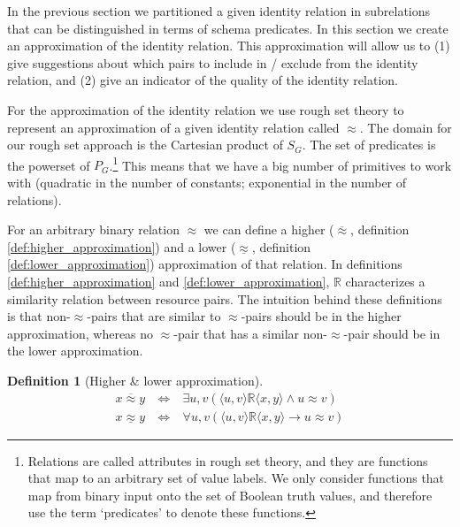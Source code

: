 \documentclass[letterpaper]{article}
\newtheorem{definition}{Definition}
\begin{document}
In the previous section we partitioned a given identity relation in subrelations that can be distinguished in terms of schema predicates. In this section we create an approximation of the identity relation. This approximation will allow us to (1) give suggestions about which pairs to include in / exclude from the identity relation, and (2) give an indicator of the quality of the identity relation.

For the approximation of the identity relation we use rough set theory \cite{pawlak_1991} to represent an approximation of a given identity relation called $\approx$. The domain for our rough set approach is the Cartesian product of $S_G$. The set of predicates is the powerset of $P_G$.\footnote{Relations are called attributes in rough set theory, and they are functions that map to an arbitrary set of value labels. We only consider functions that map from binary input onto the set of Boolean truth values, and therefore use the term `predicates' to denote these functions.} This means that we have a big number of primitives to work with (quadratic in the number of constants; exponential in the number of relations).

For an arbitrary binary relation $\approx$ we can define a higher ($\overline{\approx}$, definition \ref{def:higher_approximation}) and a lower ($\underline{\approx}$, definition \ref{def:lower_approximation}) approximation of that relation. In definitions \ref{def:higher_approximation} and \ref{def:lower_approximation}, $\mathbb{R}$ characterizes a similarity relation between resource pairs. The intuition behind these definitions is that non-$\approx$-pairs that are similar to $\approx$-pairs should be in the higher approximation, whereas no $\approx$-pair that has a similar non-$\approx$-pair should be in the lower approximation.

\begin{definition}[Higher \& lower approximation]
\begin{align}
x \overline{\approx} y \  & \iff & \ 
  \exists u,v (
      \langle u, v \rangle \mathbb{R} \langle x, y \rangle
    \land
      u \approx v
  )
\label{def:higher_approximation}
\\
x \underline{\approx} y \  & \iff & \ 
  \forall u,v (
      \langle u, v \rangle \mathbb{R} \langle x, y \rangle
    \rightarrow
      u \approx v
  )
\label{def:lower_approximation}
\end{align}
\end{definition}
\end{document}
